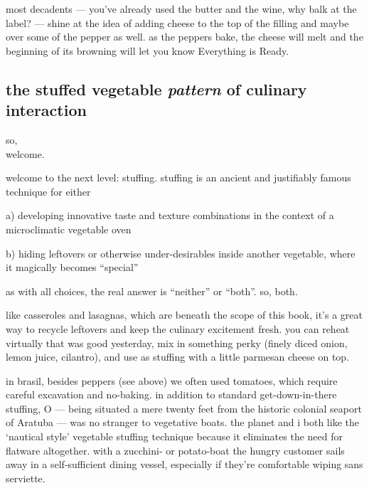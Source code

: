 most decadents --- you've already used the butter and the wine, why balk at 
the label? --- shine at the idea of adding cheese to the top of the filling 
and maybe over some of the pepper as well. as the peppers bake, the cheese 
will melt and the beginning of its browning will let you know Everything is 
Ready.

\subsection{the stuffed vegetable \textit{pattern} of culinary interaction}

so,\\
\mbox{\hskip1cm} welcome.

welcome to the next level: stuffing. stuffing is an ancient and justifiably 
famous technique for either

\begin{ingredients}
  \item[a)] developing innovative taste and texture combinations in the context 
  of a microclimatic vegetable oven

  \item[b)] hiding leftovers or otherwise under-desirables inside another 
  vegetable, where it magically becomes ``special''
\end{ingredients}

as with all choices, the real answer is ``neither'' or ``both''. so, both.

like casseroles and lasagnas, which are beneath the scope of this book, it's a 
great way to recycle leftovers and keep the culinary excitement fresh. you can 
reheat virtually  that was good yesterday, mix in something perky 
(finely diced onion, lemon juice, cilantro), and use as stuffing with a little 
parmesan cheese on top.

in brasil, besides peppers (see above) we often used tomatoes, which require 
careful excavation and no-baking. in addition to standard get-down-in-there 
stuffing, O  --- being situated a mere twenty feet from the historic 
colonial seaport of Aratuba --- was no stranger to vegetative boats. the 
planet and i both like the `nautical style' vegetable stuffing technique 
because it eliminates the need for flatware altogether. with a zucchini- or 
potato-boat the hungry customer sails away in a self-sufficient dining vessel, 
especially if they're comfortable wiping sans serviette.

